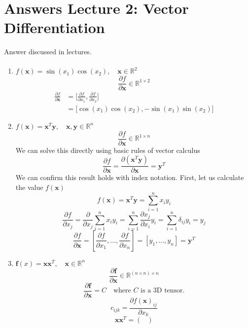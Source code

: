 \section{Answers Lecture 2: Vector Differentiation}
\paragraph{} Answer discussed in lectures.

\paragraph{}

\begin{enumerate}[label=\alph*]
    \item $f(\textbf{x}) = \sin(x_1)\cos(x_2), \quad \textbf{x}\in \mathbb{R}^2$
\[
\frac{\partial f}{\partial\textbf{x}} \in \mathbb{R}^{1\times 2}
\]
\begin{align*}
\frac{\partial f}{\partial\textbf{x}} &= \bigg[\frac{\partial f}{\partial x_1}, \frac{\partial f}{\partial x_2} \bigg]\\
&=\bigg[\cos(x_1)\cos(x_2), -\sin(x_1)\sin(x_2) \bigg]
\end{align*}
\item $f(\textbf{x}) = \textbf{x}^T\textbf{y}, \quad \textbf{x},\textbf{y}\in \mathbb{R}^n$
\[
\frac{\partial f}{\partial\textbf{x}} \in \mathbb{R}^{1\times n}
\]
We can solve this directly using basic rules of vector calculus
\[
\frac{\partial f}{\partial\textbf{x}} = \frac{\partial (\textbf{x}^T\textbf{y})}{\partial \textbf{x}} = \textbf{y}^T
\]
We can confirm this result holds with index notation. First, let us calculate the value $f(\textbf{x})$
\[
f(\textbf{x}) = \textbf{x}^T\textbf{y} = \sum_{i=1}^n x_iy_i
\]
\[
\frac{\partial f}{\partial x_j} = \frac{\partial}{\partial x_j}\sum_{i=1}^n x_iy_i =  \sum_{i=1}^n \frac{\partial x_j}{\partial x_i}y_i = \sum_{i=1}^n \delta_{ij}y_i = y_j
\]
\[
\frac{\partial f}{\partial\textbf{x}} = \left[\frac{\partial f}{\partial x_1}, \dots, \frac{\partial f}{\partial x_n}\right] = \left[y_1, \dots, y_n\right] = \textbf{y}^T
\]
\item $\textbf{f}(x) = \textbf{x}\textbf{x}^T, \quad \textbf{x}\in \mathbb{R}^n$
\[
\frac{\partial \textbf{f}}{\partial\textbf{x}} \in \mathbb{R}^{(n\times n)\times n}
\]
\[
\frac{\partial \textbf{f}}{\partial\textbf{x}}= C\quad \text{where $C$ is a 3D tensor.}
\]
\[
c_{ijk} = \frac{\partial f(\textbf{x})_{ij}}{\partial x_k}
\]
\[
\textbf{x}\textbf{x}^T = \begin{pmatrix}

\end{pmatrix}\]
\end{enumerate}
